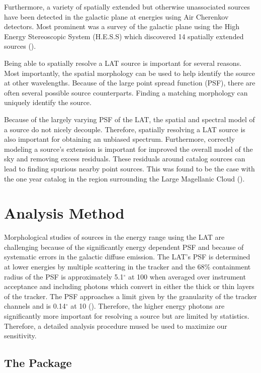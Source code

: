 \documentclass[12pt,preprint]{aastex}
\newcommand{\mev}{\text{MeV}\xspace}
\newcommand{\gev}{\text{GeV}\xspace}
\newcommand{\tev}{\text{TeV}\xspace}
\renewcommand{\deg}{\ensuremath{^\circ}\xspace}
\newcommand{\pointlike}{\text{\em pointlike}\xspace}
\begin{document}
Furthermore, a variety of spatially extended but otherwise unassociated
sources have been detected in the galactic plane at \tev energies using
Air Cherenkov detectors. Most prominent was a survey of the galactic plane
using the High Energy Stereoscopic System (H.E.S.S) which discovered 14
spatially extended sources (\cite{HESS_plane_survey}).

Being able to spatially resolve a LAT source is important for several
reasons. Most importantly, the spatial morphology can be used to
help identify the source at other wavelengths. Because of the large
point spread function (PSF), there are often several possible source
counterparts.  Finding a matching morphology can uniquely identify
the source.

Because of the largely varying PSF of the LAT, the spatial and spectral
model of a source do not nicely decouple. Therefore, spatially resolving
a LAT source is also important for obtaining an unbiased spectrum.
Furthermore, correctly modeling a source's extension is important for
improved the overall model of the sky and removing excess residuals.
These residuals around catalog sources can lead to finding spurious nearby
point sources. This was found to be the case with the one year catalog
in the region surrounding the Large Magellanic Cloud (\cite{first_cat}).


\section{Analysis Method}

Morphological studies of sources in the \gev energy range
using the LAT are challenging because of the significantly energy
dependent PSF and because of systematic errors in the galactic diffuse
emission.  The LAT's PSF is determined at lower energies by multiple
scattering in the tracker and the 68\% containment radius of the PSF is
approximately 5.1\deg at 100 \mev  when averaged over instrument acceptance
and including photons which convert in either the thick or thin layers of
the tracker. The PSF approaches a limit given by the granularity of the
tracker channels and is 0.14\deg at 10 \gev (\cite{on_orbit_calibration}).
Therefore, the higher energy photons are significantly more important for
resolving a source but are limited by statistics. Therefore,
a detailed analysis procedure mused be used to maximize our
sensitivity.

\subsection{The \pointlike Package}
\end{document}

